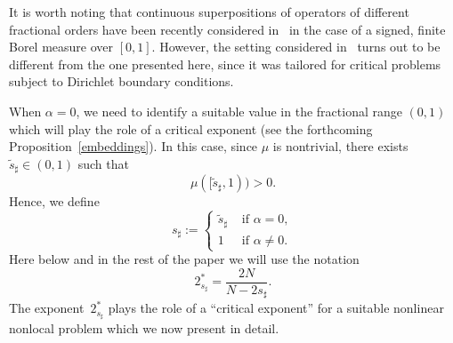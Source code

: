 \documentclass[12pt,a4paper,intlimits,sumlimits]{amsart}
\theoremstyle{definition}
\theoremstyle{plain}
\numberwithin{equation}{section}
\begin{document}
It is worth noting that continuous superpositions of operators of different fractional orders have been recently considered in~\cite{DPSV, DPSV-P} in the case of a signed, finite Borel measure over $[0, 1]$. 
However, the setting considered in~\cite{DPSV, DPSV-P} turns out to be different from the one presented here, since it was tailored for critical problems subject to Dirichlet boundary conditions.

When $\alpha=0$, we need to identify a suitable value in the fractional range $(0, 1)$ which will play the role of a critical exponent (see the forthcoming Proposition~\ref{embeddings}).
In this case, since $\mu$ is nontrivial, there exists $\widetilde{s}_\sharp\in (0, 1)$ such that
\[
\mu([\widetilde{s}_\sharp, 1))>0.
\]
Hence, we define
\begin{equation}\label{ssharp}
s_\sharp:=\begin{cases}
\widetilde{s}_\sharp &\mbox{ if } \alpha =0,\\
1 &\mbox{ if } \alpha\neq 0.
\end{cases}
\end{equation}
Here below and in the rest of the paper we will use the notation
\[
2^*_{s_\sharp} = \frac{2N}{N-2s_\sharp}.
\]
The exponent~$2^*_{s_\sharp}$ plays the role of a ``critical exponent'' for a suitable nonlinear nonlocal problem which we now present in detail.\medskip
\end{document}
